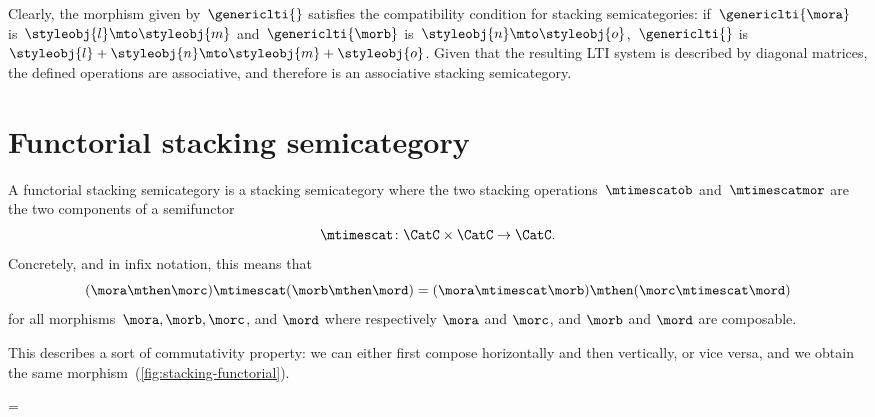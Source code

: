 Clearly, the morphism given by~$\genericlti{}$ satisfies the compatibility condition for stacking semicategories:
if~$\genericlti{\mora}$ is~$\styleobj{l}\mto \styleobj{m}$ and~$\genericlti{\morb}$ is~$\styleobj{n}\mto \styleobj{o}$,~$\genericlti{}$ is~$\styleobj{l}+\styleobj{n}\mto \styleobj{m}+\styleobj{o}$.
Given that the resulting LTI system is described by diagonal matrices, the defined operations are associative, and therefore \LTI is an associative stacking semicategory.

\section{Functorial stacking semicategory}

\begin{ctdefinition}
    \label{def:functorial-stacking-semi-cat}
    A functorial stacking semicategory is a stacking semicategory where the two stacking operations~$\mtimescatob$ and~$\mtimescatmor$ are the two components of a semifunctor
    \begin{equation}
        \mtimescat\colon \CatC \times \CatC \to \CatC.
    \end{equation}
    Concretely, and in infix notation, this means that
    \begin{equation}
        (\mora \mthen \morc ) \mtimescat (\morb \mthen \mord )
        =
        (\mora \mtimescat \morb )
        \mthen (\morc \mtimescat \mord )
    \end{equation}
    for all morphisms~$\mora, \morb, \morc$, and $\mord$ where respectively $\mora$ and $\morc$, and $\morb$ and $\mord$ are composable.
\end{ctdefinition}

%
This describes a sort of commutativity property: we can either first compose horizontally and then vertically, or vice versa, and we obtain the same morphism~(\cref{fig:stacking-functorial}).

\begin{figure*}[h]
    \centering
    =
    \caption{Commutation of stacking and composition in a functorial stacking semicategory. }
    \label{fig:stacking-functorial}
\end{figure*}

